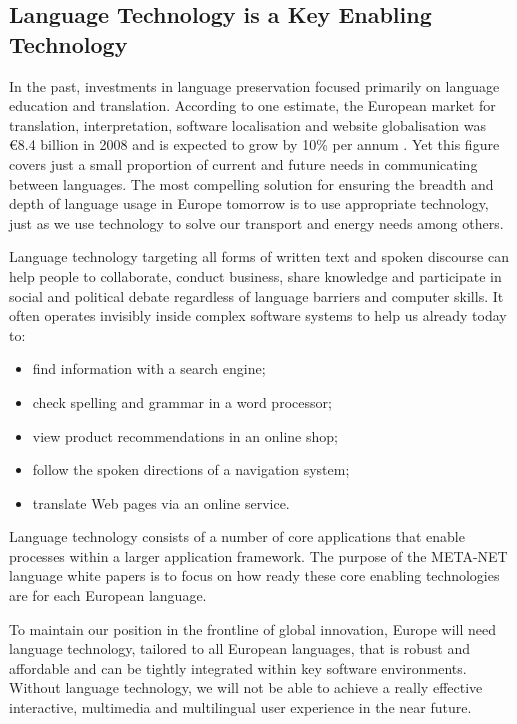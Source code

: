 {\begin{multicols}{2}
\subsection{Language Technology is a Key Enabling Technology}

In the past, investments in language preservation focused primarily on language education and translation. According to one estimate, the European market for translation, interpretation, software localisation and website globalisation was €8.4 billion in 2008 and is expected to grow by 10\% per annum \cite{EC3}. Yet this figure covers just a small proportion of current and future needs in communicating between languages. The most compelling solution for ensuring the breadth and depth of language usage in Europe tomorrow is to use appropriate technology, just as we use technology to solve our transport and energy needs among others.

Language technology targeting all forms of written text and spoken discourse can help people to collaborate, conduct business, share knowledge and participate in social and political debate regardless of language barriers and computer skills. It often operates invisibly inside complex software systems to help us already today to:

\begin{itemize}
\item find information with a search engine;
\item check spelling and grammar in a word processor;
\item view product recommendations in an online shop;
\item follow the spoken directions of a navigation system;
\item translate Web pages via an online service.
\end{itemize}

Language technology consists of a number of core applications that enable processes within a larger application framework. The purpose of the META-NET language white papers is to focus on how ready these core enabling technologies are for each European language. 


To maintain our position in the frontline of global innovation, Europe will need language technology, tailored to all European languages, that is robust and affordable and can be tightly integrated within key software environments. Without language technology, we will not be able to achieve a really effective interactive, multimedia and multilingual user experience in the near future.


\end{multicols}}
